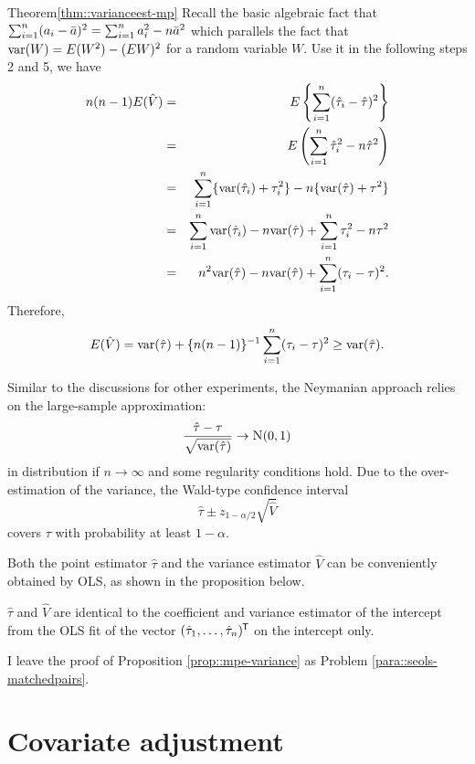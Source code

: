 


\begin{myproof}{Theorem}{\ref{thm::varianceest-mp}}
Recall the basic algebraic fact that $\sum_{i=1}^n (a_i - \bar a)^2 = \sum_{i=1}^n a_i^2 - n \bar{a}^2$ which parallels the fact that $\textup{var}(W) = E(W^2) - (EW)^2$ for a random variable $W$. Use it in the following steps 2 and 5, we have 
\begin{eqnarray*}
n(n-1) E( \hat{V} ) &=& E\left\{   \sum_{i=1}^n (\hat{\tau}_i - \hat{\tau})^2 \right\}  \\
&=&  E\left (    \sum_{i=1}^n \hat{\tau}_i^2 - n \hat{\tau}^2  \right)   \\
&=& \sum_{i=1}^n \{  \textup{var}(\hat{\tau}_i) + \tau_i^2 \} - n \{  \textup{var}(\hat{\tau})  + \tau^2 \}\\
&=& \sum_{i=1}^n  \textup{var}(\hat{\tau}_i)  - n \textup{var}(\hat{\tau}) + \sum_{i=1}^n  \tau_i^2 - n  \tau^2 \\
&=& n^2 \textup{var}(\hat{\tau})  - n \textup{var}(\hat{\tau})  + \sum_{i=1}^n (\tau_i - \tau)^2.
\end{eqnarray*}
Therefore,
$$
E( \hat{V} )  = \textup{var}(\hat{\tau})  + \{ n(n-1)  \}^{-1}   \sum_{i=1}^n (\tau_i - \tau)^2 \geq  \textup{var}(\hat{\tau})  .
$$
\end{myproof}




Similar to the discussions for other experiments, the Neymanian approach relies on the large-sample approximation:
$$
\frac{  \hat\tau  -  \tau }{  \sqrt{\var( \hat\tau )} } \rightarrow \N01
$$
in distribution if $n\rightarrow \infty$ and some regularity conditions hold. Due to the over-estimation of the variance, the Wald-type confidence interval
$$
 \hat\tau   \pm     z_{1-\alpha/2}  \sqrt{ \hat{V} }
$$
covers $\tau$ with probability at least $1-\alpha$.



Both the point estimator $\hat\tau$ and the variance estimator $\hat{V}$ can be conveniently obtained by OLS, as shown in the proposition below. 

\begin{proposition}\label{prop::mpe-variance}
$\hat\tau$ and
$\hat{V}$ are identical to the coefficient and variance estimator of the intercept from the OLS fit of the vector $(\hat{\tau}_1, \ldots, \hat{\tau}_n)^{\mkern-1.5mu\mathsf{T}}$ on the intercept only.
\end{proposition}

  I leave the proof of Proposition \ref{prop::mpe-variance} as Problem \ref{para::seols-matchedpairs}. 
  
  

\section{Covariate adjustment}



